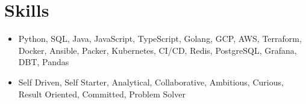 \section{Skills}
\begin{itemize}
  \item Python, SQL, Java, JavaScript, TypeScript, Golang, GCP, AWS, Terraform, Docker, Ansible, Packer, Kubernetes, CI/CD, Redis, PostgreSQL, Grafana, DBT, Pandas
  \item Self Driven, Self Starter, Analytical, Collaborative, Ambitious, Curious, Result Oriented, Committed, Problem Solver
\end{itemize}

